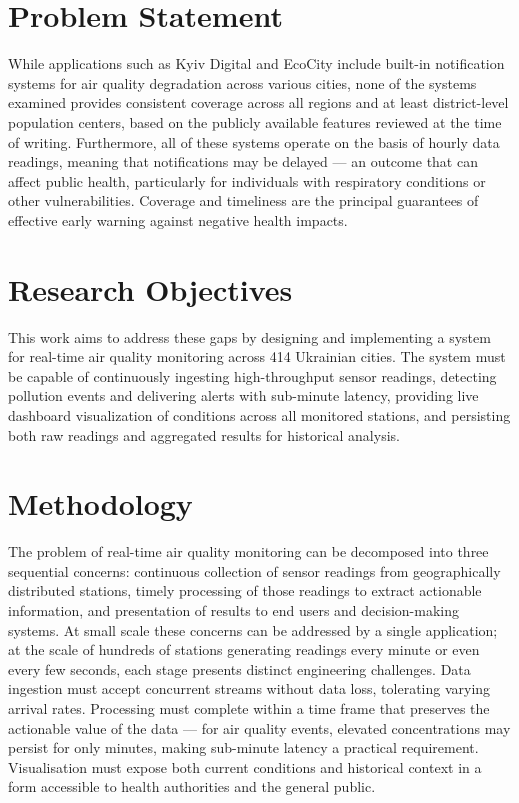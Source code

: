 \section{Problem Statement}
While applications such as Kyiv Digital and EcoCity include built-in notification systems for air quality degradation across various cities, none of the systems examined provides consistent coverage across all regions and at least district-level population centers, based on the publicly available features reviewed at the time of writing. Furthermore, all of these systems operate on the basis of hourly data readings, meaning that notifications may be delayed — an outcome that can affect public health, particularly for individuals with respiratory conditions or other vulnerabilities. Coverage and timeliness are the principal guarantees of effective early warning against negative health impacts.

\section{Research Objectives}
\label{sec:objectives}
This work aims to address these gaps by designing and implementing a system for real-time air quality monitoring across 414 Ukrainian cities. The system must be capable of continuously ingesting high-throughput sensor readings, detecting pollution events and delivering alerts with sub-minute latency, providing live dashboard visualization of conditions across all monitored stations, and persisting both raw readings and aggregated results for historical analysis.

\section{Methodology}
The problem of real-time air quality monitoring can be decomposed into three sequential concerns: continuous collection of sensor readings from geographically distributed stations, timely processing of those readings to extract actionable information, and presentation of results to end users and decision-making systems. At small scale these concerns can be addressed by a single application; at the scale of hundreds of stations generating readings every minute or even every few seconds, each stage presents distinct engineering challenges. Data ingestion must accept concurrent streams without data loss, tolerating varying arrival rates. Processing must complete within a time frame that preserves the actionable value of the data — for air quality events, elevated concentrations may persist for only minutes, making sub-minute latency a practical requirement. Visualisation must expose both current conditions and historical context in a form accessible to health authorities and the general public.

